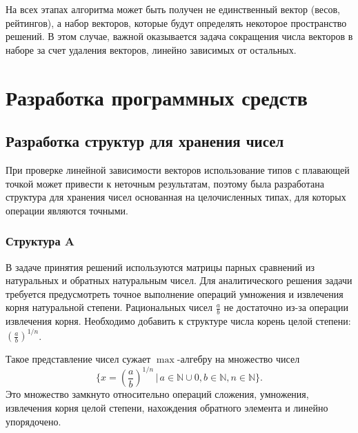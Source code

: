 \documentclass[specialist, substylefile = spbureport.rtx,
               subf,href,colorlinks=true, 12pt]{disser}
\begin{document}
    На всех этапах алгоритма может быть получен не единственный вектор (весов, рейтингов), а набор векторов, которые будут определять некоторое пространство решений. В этом случае, важной оказывается задача сокращения числа векторов в наборе за счет удаления векторов, линейно зависимых от остальных.

    \chapter{Разработка программных средств}

    \section{Разработка структур для хранения чисел}

    При проверке линейной зависимости векторов использование типов с плавающей точкой может привести к неточным результатам, поэтому была разработана структура для хранения чисел основанная на целочисленных типах, для которых операции являются точными.

    \subsection{Структура A}

    В задаче принятия решений используются матрицы парных сравнений из натуральных и обратных натуральным чисел.
    Для аналитического решения задачи требуется предусмотреть точное выполнение операций умножения и извлечения корня натуральной степени.
    Рациональных чисел $\displaystyle \frac{a}{b}$ не достаточно из-за операции извлечения корня. 
    Необходимо добавить к структуре числа корень целой степени:  $\displaystyle \left(\frac{a}{b}\right)^{1/n}$.
    
    Такое представление чисел сужает $\max$-алгебру на множество чисел
    $$\Big\{x = \displaystyle \left(\frac{a}{b}\right)^{1/n} \, |\, a \in \mathbb{N} \cup 0, b \in \mathbb{N}, n \in \mathbb{N}\Big\}.$$ Это множество замкнуто относительно операций сложения, умножения, извлечения корня целой степени, нахождения обратного элемента и линейно упорядочено. 
\end{document}
